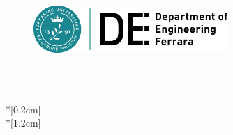 \thispagestyle{empty}             %
\calccentering{\unitlength}
\begin{figure}[h!]
    \hfill\includegraphics[height=1.8cm]{graphics/DE}
\end{figure}
\begin{adjustwidth*}{\unitlength}{-\unitlength}
    \begin{adjustwidth}{-0.5cm}{-0.5cm}
        \sffamily
        \begin{flushright}
        \end{flushright}
        \vspace*{\fill}
        \noindent
        \HUGE \thesistitle{}\\*[0.2cm]
        \Huge \thesissubtitle{}\\*[1.2cm]
        \parbox[b]{\linewidth}{%
            \LARGE 
            \normalsize
            \thesislocation{} \the\year
        }
    \end{adjustwidth}
\end{adjustwidth*}
\normalfont
\normalsize
